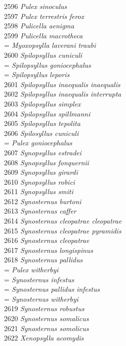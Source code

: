 \documentclass[
]{article}
\begin{document}
2596 \emph{Pulex sinoculus}\\
2597 \emph{Pulex terrestris ferox}\\
2598 \emph{Pulicella aenigma}\\
2599 \emph{Pulicella macrotheca}\\
= \emph{Myoxopsylla laverani traubi}\\
2600 \emph{Spilopsyllus cuniculi}\\
= \emph{Spilopsyllus goniocephalus}\\
= \emph{Spilopsyllus leporis}\\
2601 \emph{Spilopsyllus inaequalis inaequalis}\\
2602 \emph{Spilopsyllus inaequalis interrupta}\\
2603 \emph{Spilopsyllus simplex}\\
2604 \emph{Spilopsyllus spillmanni}\\
2605 \emph{Spilopsyllus tepolita}\\
2606 \emph{Spilosyllus cuniculi}\\
= \emph{Pulex goniocephalus}\\
2607 \emph{Synopsyllus estradei}\\
2608 \emph{Synopsyllus fonquernii}\\
2609 \emph{Synopsyllus girardi}\\
2610 \emph{Synopsyllus robici}\\
2611 \emph{Synopsyllus smiti}\\
2612 \emph{Synosternus burtoni}\\
2613 \emph{Synosternus caffer}\\
2614 \emph{Synosternus cleopatrae cleopatrae}\\
2615 \emph{Synosternus cleopatrae pyramidis}\\
2616 \emph{Synosternus cleopatrae}\\
2617 \emph{Synosternus longispinus}\\
2618 \emph{Synosternus pallidus}\\
= \emph{Pulex witherbyi}\\
= \emph{Synosternus infestus}\\
= \emph{Synosternus pallidus infestus}\\
= \emph{Synosternus witherbyi}\\
2619 \emph{Synosternus robustus}\\
2620 \emph{Synosternus somalicus}\\
2621 \emph{Synosternus somolicus}\\
2622 \emph{Xenopsylla acomydis}\\
\end{document}
